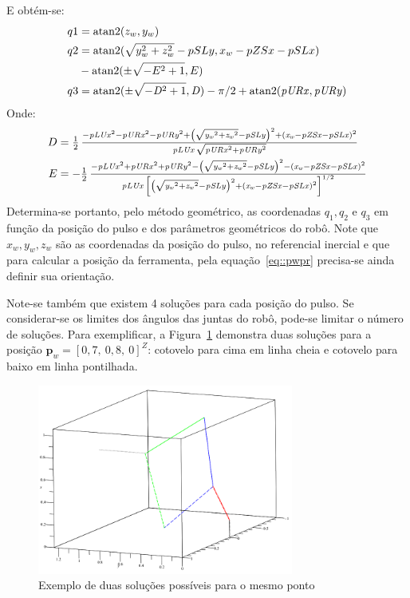 %
E obtém-se:
%
\begin{align}
	q1 &= \operatorname{atan2} (z_w,y_w) \label{eq::q1ik} \\
	q2 &= \operatorname{atan2} ( \sqrt {y_w^2 + z_w^2}- pSLy, x_w - pZSx - pSLx ) \nonumber \\
	   &- \operatorname{atan2} ( \pm \sqrt {-E^2+1}, E ) \\
	q3 &= \operatorname{atan2} ( \pm \sqrt {-{{\it D}}^{2}+1},{\it D} ) -\pi /2 +
\operatorname{atan2} ( {\it pURx},{\it pURy} ) \label{eq::q3ik}
\end{align}
%
Onde:
%
\begin{align}
	D &= \textstyle \frac{1}{2}\,{\frac {-{{\it pLUx}}^{2}-{{\it pURx}}^{2}-{{\it
	pURy}}^{2}+ \left( \sqrt {{{\it y_w}}^{2}+{{\it z_w}}^{2}}-{\it pSLy} \right) ^{2
		}+ \left( {\it x_w}-{\it pZSx}-{\it pSLx} \right) ^{2}}{{\it pLUx}\,
		\sqrt {{{\it pURx}}^{2}+{{\it pURy}}^{2}}}} \\
	E &= \textstyle {-\frac{1}{2}\,{\frac {-{{\it pLUx}}^{2}+{{\it pURx}}^{2}+{{\it
		pURy}}^{2}- \left( \sqrt {{{\it y_w}}^{2}+{{\it z_w}}^{2}}-{\it pSLy} \right)
		^{2 }- \left( {\it x_w}-{\it pZSx}-{\it pSLx} \right) ^{2}}{{\it pLUx}\,
		\left[ \left( \sqrt {{{\it y_w}}^{2}+{{\it z_w}}^{2}}-{\it pSLy}
 		\right) ^{2}+ \left( {\it x_w}-{\it pZSx}-{\it pSLx} \right) ^{2}
 		\right]^{1/2}}}}
\end{align}
%
Determina-se portanto, pelo método geométrico, as coordenadas $q_1, q_2$ e
$q_3$ em função da posição do pulso e dos parâmetros geométricos do robô. Note que $x_w,
y_w, z_w$ são as coordenadas da posição do pulso, no referencial inercial e que
para calcular a posição da ferramenta, pela equação~\ref{eq::pwpr} precisa-se
ainda definir sua orientação.

Note-se também que existem 4 soluções para cada posição do pulso. Se
considerar-se os limites dos ângulos das juntas do robô, pode-se limitar o
número de soluções. Para exemplificar, a Figura~\ref{fig::elbowupdown} demonstra
duas soluções para a posição $\mathbf{p}_{w} = [0,7,~ 0,8,~ 0]^Z$: cotovelo para
cima em linha cheia e cotovelo para baixo em linha pontilhada.

\begin{figure}[h]
	\centering 
 	\includegraphics[width=0.75\textwidth]{figs/elbowupdown}
 	\caption{Exemplo de duas soluções possíveis para o mesmo ponto}
 	\label{fig::elbowupdown}
\end{figure}


